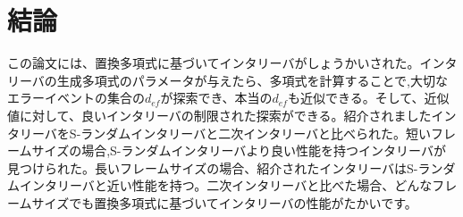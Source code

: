\documentclass[24 pts]{article}
\begin{document}
\section{結論}
この論文には、置換多項式に基づいてインタリーバがしょうかいされた。インタリーバの生成多項式のパラメータが与えたら、多項式を計算することで,大切なエラーイベントの集合の$d_{ef}$が探索でき、本当の$d_{ef}$も近似できる。そして、近似値に対して、良いインタリーバの制限された探索ができる。紹介されましたインタリーバをS-ランダムインタリーバと二次インタリーバと比べられた。短いフレームサイズの場合,S-ランダムインタリーバより良い性能を持つインタリーバが見つけられた。長いフレームサイズの場合、紹介されたインタリーバはS-ランダムインタリーバと近い性能を持つ。二次インタリーバと比べた場合、どんなフレームサイズでも置換多項式に基づいてインタリーバの性能がたかいです。
\end{document}

